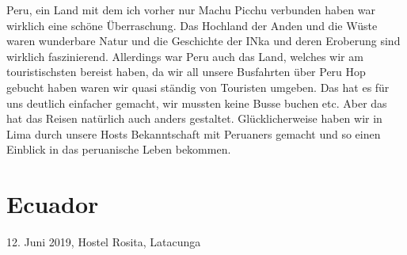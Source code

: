 \documentclass[11pt]{book}
\begin{document}
Peru, ein Land mit dem ich vorher nur Machu Picchu verbunden haben war wirklich eine schöne Überraschung. Das Hochland der Anden und die Wüste waren 
wunderbare Natur und die Geschichte der INka und deren Eroberung sind wirklich faszinierend. Allerdings war Peru auch das Land, welches wir am touristischsten 
bereist haben, da wir all unsere Busfahrten über Peru Hop gebucht haben waren wir quasi ständig von Touristen umgeben. Das hat es für uns deutlich 
einfacher gemacht, wir mussten keine Busse buchen etc. Aber das hat das Reisen natürlich auch anders gestaltet. Glücklicherweise haben wir in Lima durch unsere 
Hosts Bekanntschaft mit Peruaners gemacht und so einen Einblick in das peruanische Leben bekommen. 


\chapter{Ecuador}

12. Juni 2019, Hostel Rosita, Latacunga
\end{document}
